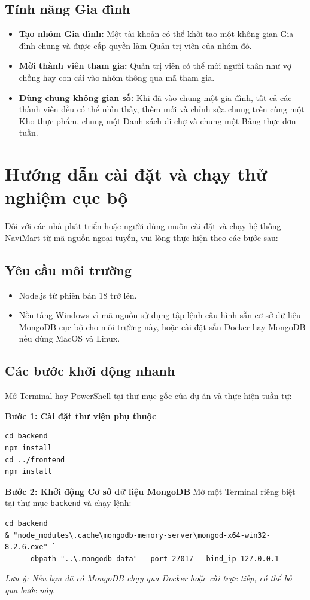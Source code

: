 \documentclass[../main.tex]{subfiles}
\begin{document}
\subsection{Tính năng Gia đình}
\begin{itemize}
    \item \textbf{Tạo nhóm Gia đình:} Một tài khoản có thể khởi tạo một không gian Gia đình chung và được cấp quyền làm Quản trị viên của nhóm đó.
    \item \textbf{Mời thành viên tham gia:} Quản trị viên có thể mời người thân như vợ chồng hay con cái vào nhóm thông qua mã tham gia.
    \item \textbf{Dùng chung không gian số:} Khi đã vào chung một gia đình, tất cả các thành viên đều có thể nhìn thấy, thêm mới và chỉnh sửa chung trên cùng một Kho thực phẩm, chung một Danh sách đi chợ và chung một Bảng thực đơn tuần.
\end{itemize}

\section{Hướng dẫn cài đặt và chạy thử nghiệm cục bộ}
Đối với các nhà phát triển hoặc người dùng muốn cài đặt và chạy hệ thống NaviMart từ mã nguồn ngoại tuyến, vui lòng thực hiện theo các bước sau:

\subsection{Yêu cầu môi trường}
\begin{itemize}
    \item Node.js từ phiên bản 18 trở lên.
    \item Nền tảng Windows vì mã nguồn sử dụng tập lệnh cấu hình sẵn cơ sở dữ liệu MongoDB cục bộ cho môi trường này, hoặc cài đặt sẵn Docker hay MongoDB nếu dùng MacOS và Linux.
\end{itemize}

\subsection{Các bước khởi động nhanh}
Mở Terminal hay PowerShell tại thư mục gốc của dự án và thực hiện tuần tự:

\textbf{Bước 1: Cài đặt thư viện phụ thuộc}
\begin{verbatim}
cd backend
npm install
cd ../frontend
npm install
\end{verbatim}

\textbf{Bước 2: Khởi động Cơ sở dữ liệu MongoDB}
Mở một Terminal riêng biệt tại thư mục \texttt{backend} và chạy lệnh:
\begin{verbatim}
cd backend
& "node_modules\.cache\mongodb-memory-server\mongod-x64-win32-8.2.6.exe" `
    --dbpath "..\.mongodb-data" --port 27017 --bind_ip 127.0.0.1
\end{verbatim}
\textit{Lưu ý: Nếu bạn đã có MongoDB chạy qua Docker hoặc cài trực tiếp, có thể bỏ qua bước này.}
\end{document}
